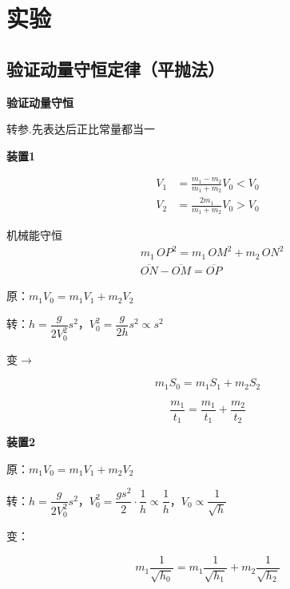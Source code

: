 \section{实验}
\subsection{验证动量守恒定律（平抛法）}
\textbf{验证动量守恒}

\hspace{2em}转参.先表达后正比常量都当一

\textbf{装置1}


\begin{align*}
V_1&=\frac{m_1-m_2}{m_1+m_2}V_0<V_0\\
V_2&=\frac{2m_1}{m_1+m_2}V_0>V_0
\end{align*}

机械能守恒
\begin{align*}
& m_1\,OP^2=m_1\,OM^2+m_2\,ON^2\\
& \overline{ON}-\overline{OM}=\overline{OP}
\end{align*}

原：$m_1V_0=m_1V_1+m_2V_2$

转：$h=\dfrac{g}{2V_0^2}s^2$，\quad $V_0^2=\dfrac{g}{2h}s^2\propto s^2$

变$\to$
\begin{keybox}
\[m_1S_0=m_1S_1+m_2S_2\]
\end{keybox}

\begin{keybox}
\[\frac{m_1}{t_1}=\frac{m_1}{t_1}+\frac{m_2}{t_2}\] %
\end{keybox}

\textbf{装置2}


原：$m_1V_0=m_1V_1+m_2V_2$

转：$h=\dfrac{g}{2V_0^2}s^2$，\quad $V_0^2=\dfrac{gs^2}{2}\cdot\dfrac{1}{h}\propto\dfrac{1}{h}$，\quad $V_0\propto\dfrac{1}{\sqrt{h}}$

变：
\begin{keybox}
\[m_1\frac{1}{\sqrt{h_0}}=m_1\frac{1}{\sqrt{h_1}}+m_2\frac{1}{\sqrt{h_2}}\]
\end{keybox}

